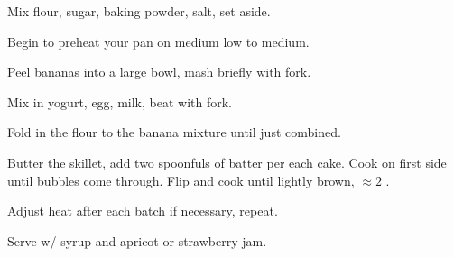 \begin{preparation}
\item Mix flour, sugar, baking powder, salt, set aside.

\item Begin to preheat your pan on medium low to medium.

\item Peel bananas into a large bowl, mash briefly with fork.

\item Mix in yogurt, egg, milk, beat with fork.

\item Fold in the flour to the banana mixture until just combined.

\item Butter the skillet, add two spoonfuls of batter per each cake.
    Cook on first side until bubbles come through.
    Flip and cook until lightly brown, $\approx2$ \minute.

\item Adjust heat after each batch if necessary, repeat.

\item Serve w/ syrup and apricot or strawberry jam.
\end{preparation}

\recipeend%

